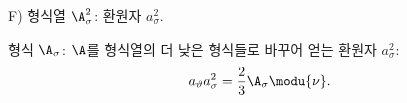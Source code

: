 
F) 형식열 $\A_\sigma^2$: 환원자 $a_\sigma^2$.

형식 $\A_\sigma$: $\A$를 형식열의 더 낮은 형식들로 바꾸어 얻는 환원자 $a_\sigma^2$:
\[
a_\vartheta a_\sigma^2=\frac23\A_\sigma\modu{\nu}.
\]
